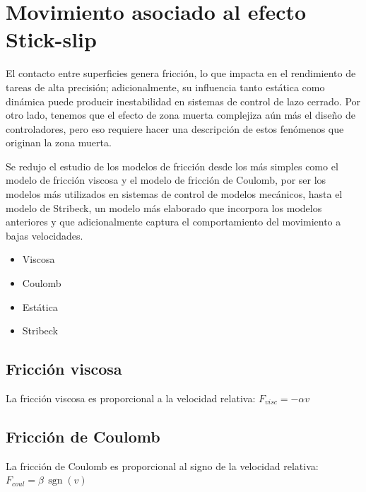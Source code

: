 \section{Movimiento asociado al efecto Stick-slip}
El contacto entre superficies genera fricción, lo que impacta en el rendimiento de tareas de alta precisión; adicionalmente, su influencia tanto estática como dinámica puede producir inestabilidad en sistemas de control de lazo cerrado. Por otro lado, tenemos que el efecto de zona muerta complejiza aún más el diseño de controladores, pero eso requiere hacer una descripción de estos fenómenos que originan la zona muerta.

Se redujo el estudio de los modelos de fricción desde los más simples como el modelo de  fricción viscosa y el modelo de fricción de Coulomb, por ser los modelos más utilizados en sistemas de control de modelos mecánicos, hasta el modelo de Stribeck, un modelo más elaborado que incorpora los modelos anteriores y que adicionalmente captura el comportamiento del movimiento a bajas velocidades.
\begin{itemize}
    \item Viscosa
    \item Coulomb
    \item Estática
    \item Stribeck
\end{itemize}





\subsection{Fricción viscosa}
La fricción viscosa es proporcional a la velocidad relativa:
\(F_{visc} = -\alpha v\)
\begin{center}
\end{center}

\subsection{Fricción de Coulomb}
La fricción de Coulomb es proporcional al signo de la velocidad relativa:
\(F_{coul} = \beta \, \operatorname{sgn}(v)\)

